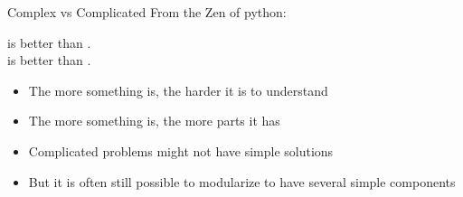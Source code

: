 \begin{frame}{Complex vs Complicated}
	From the Zen of python:
	
	\bigskip
	\begin{center}
		 is better than .\\
		 is better than .
	\end{center}
	\bigskip
	
	\begin{itemize}
		\item The more  something is, the harder it is to understand
		\item The more  something is, the more parts it has
	\end{itemize}

	\bigskip
	\begin{itemize}
		\item Complicated problems might not have simple solutions
		\item But it is often still possible to modularize to have several simple components
	\end{itemize}
\end{frame}




